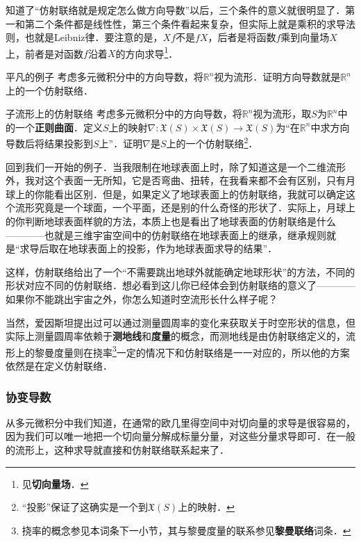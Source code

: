 知道了“仿射联络就是规定怎么做方向导数”以后，三个条件的意义就很明显了．第一和第二个条件都是线性性，第三个条件看起来复杂，但实际上就是乘积的求导法则，也就是Leibniz律．要注意的是，$Xf$不是$fX$，后者是将函数$f$乘到向量场$X$上，前者是对函数$f$沿着$X$的方向求导\footnote{见\textbf{切向量场}．}．


\begin{exercise}{平凡的例子}
考虑多元微积分中的方向导数，将$\mathbb{R}^n$视为流形．证明方向导数就是$\mathbb{R}^n$上的一个仿射联络．
\end{exercise}

\begin{exercise}{子流形上的仿射联络}
考虑多元微积分中的方向导数，将$\mathbb{R}^n$视为流形，取$S$为$\mathbb{R}^n$中的一个\textbf{正则曲面}．定义$S$上的映射$\nabla:\mathfrak{X}(S)\times\mathfrak{X}(S)\to\mathfrak{X}(S)$为“在$\mathbb{R}^n$中求方向导数后将结果投影到$S$上”．证明$\nabla$是$S$上的一个仿射联络\footnote{“投影”保证了这确实是一个到$\mathfrak{X}(S)$上的映射．}．
\end{exercise}

回到我们一开始的例子．当我限制在地球表面上时，除了知道这是一个二维流形外，我对这个表面一无所知，它是否弯曲、扭转，在我看来都不会有区别，只有月球上的你能看出区别．但是，如果定义了地球表面上的仿射联络，我就可以确定这个流形究竟是一个球面，一个平面，还是别的什么奇怪的形状了．实际上，月球上的你判断地球表面样貌的方法，本质上也是看出了地球表面的仿射联络是什么————也就是三维宇宙空间中的仿射联络在地球表面上的继承，继承规则就是“求导后取在地球表面上的投影，作为地球表面求导的结果”．

这样，仿射联络给出了一个“不需要跳出地球外就能确定地球形状”的方法，不同的形状对应不同的仿射联络．想必看到这儿你已经体会到仿射联络的意义了————如果你不能跳出宇宙之外，你怎么知道时空流形长什么样子呢？

当然，爱因斯坦提出过可以通过测量圆周率的变化来获取关于时空形状的信息，但实际上测量圆周率依赖于\textbf{测地线}和\textbf{度量}的概念，而测地线是由仿射联络定义的，流形上的黎曼度量则在挠率\footnote{挠率的概念参见本词条下一小节，其与黎曼度量的联系参见\textbf{黎曼联络}词条．}一定的情况下和仿射联络是一一对应的，所以他的方案依然是在定义仿射联络．

\subsubsection{协变导数}

从多元微积分中我们知道，在通常的欧几里得空间中对切向量的求导是很容易的，因为我们可以唯一地把一个切向量分解成标量分量，对这些分量求导即可．在一般的流形上，这种求导就直接和仿射联络联系起来了．

